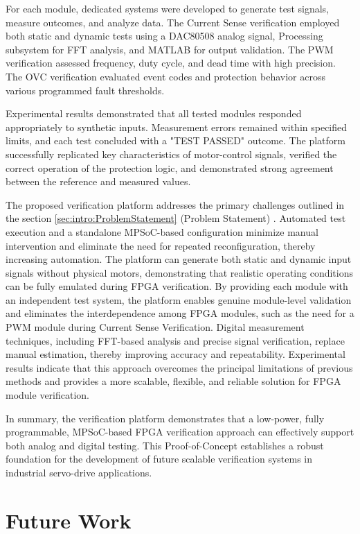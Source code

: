For each module, dedicated systems were developed to generate test signals, measure outcomes, and analyze data. The Current Sense verification employed both static and dynamic tests using a DAC80508 analog signal, Processing subsystem for \acs{FFT} analysis, and MATLAB for output validation. The \acs{PWM} verification assessed frequency, duty cycle, and dead time with high precision. The \acs{OVC} verification evaluated event codes and protection behavior across various programmed fault thresholds.

Experimental results demonstrated that all tested modules responded appropriately to synthetic inputs. Measurement errors remained within specified limits, and each test concluded with a "TEST PASSED" outcome. The platform successfully replicated key characteristics of motor-control signals, verified the correct operation of the protection logic, and demonstrated strong agreement between the reference and measured values.

The proposed verification platform addresses the primary challenges outlined in the section \ref{sec:intro:ProblemStatement} (Problem Statement) . Automated test execution and a standalone \acs{MPSoC}-based configuration minimize manual intervention and eliminate the need for repeated reconfiguration, thereby increasing automation. The platform can generate both static and dynamic input signals without physical motors, demonstrating that realistic operating conditions can be fully emulated during \acs{FPGA} verification. By providing each module with an independent test system, the platform enables genuine module-level validation and eliminates the interdependence among \acs{FPGA} modules, such as the need for a \acs{PWM} module during Current Sense Verification. Digital measurement techniques, including \acs{FFT}-based analysis and precise signal verification, replace manual estimation, thereby improving accuracy and repeatability. Experimental results indicate that this approach overcomes the principal limitations of previous methods and provides a more scalable, flexible, and reliable solution for \acs{FPGA} module verification.

In summary, the verification platform demonstrates that a low-power, fully programmable, \acs{MPSoC}-based \acs{FPGA} verification approach can effectively support both analog and digital testing. This Proof-of-Concept establishes a robust foundation for the development of future scalable verification systems in industrial servo-drive applications.

\section{Future Work}

